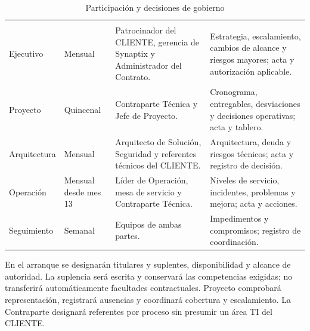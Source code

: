 \begingroup
\setlength{\tabcolsep}{3pt}
\begin{longtable}{
L{\dimexpr.20\tabcolsep\relax}
L{\dimexpr.16\tabcolsep\relax}
L{\dimexpr.32\tabcolsep\relax}
L{\dimexpr.32\tabcolsep\relax}}
\caption{Participación y decisiones de gobierno}
\label{tab:t9-comites}\\
\hline
{} &
 &
 &
\\
\hline
\endfirsthead

\hline
{} &
 &
 &
\\
\hline
\endhead

Ejecutivo &
Mensual &
Patrocinador del CLIENTE, gerencia de Synaptix y Administrador del Contrato. &
Estrategia, escalamiento, cambios de alcance y riesgos mayores; acta y autorización aplicable.\\
\hline

Proyecto &
Quincenal &
Contraparte Técnica y Jefe de Proyecto. &
Cronograma, entregables, desviaciones y decisiones operativas; acta y tablero.\\
\hline

Arquitectura &
Mensual &
Arquitecto de Solución, Seguridad y referentes técnicos del CLIENTE. &
Arquitectura, deuda y riesgos técnicos; acta y registro de decisión.\\
\hline

Operación &
Mensual desde mes 13 &
Líder de Operación, mesa de servicio y Contraparte Técnica. &
Niveles de servicio, incidentes, problemas y mejora; acta y acciones.\\
\hline

Seguimiento &
Semanal &
Equipos de ambas partes. &
Impedimentos y compromisos; registro de coordinación.\\
\hline
\end{longtable}
\endgroup

En el arranque se designarán titulares y suplentes, disponibilidad y alcance de autoridad. La suplencia será escrita y conservará las competencias exigidas; no transferirá automáticamente facultades contractuales. Proyecto comprobará representación, registrará ausencias y coordinará cobertura y escalamiento. La Contraparte designará referentes por proceso sin presumir un área TI del CLIENTE.

